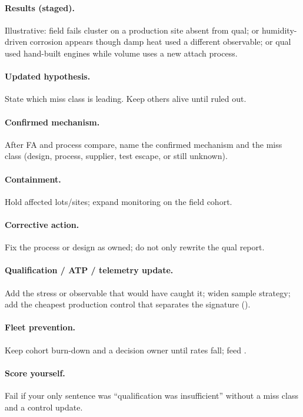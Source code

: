 \paragraph{Results (staged).}
Illustrative: field fails cluster on a production site absent from qual; or
humidity-driven corrosion appears though damp heat used a different observable;
or qual used hand-built engines while volume uses a new attach process.

\paragraph{Updated hypothesis.}
State which miss class is leading. Keep others alive until ruled out.

\paragraph{Confirmed mechanism.}
After FA and process compare, name the confirmed mechanism and the miss class
(design, process, supplier, test escape, or still unknown).

\paragraph{Containment.}
Hold affected lots/sites; expand monitoring on the field cohort.

\paragraph{Corrective action.}
Fix the process or design as owned; do not only rewrite the qual report.

\paragraph{Qualification / ATP / telemetry update.}
Add the stress or observable that would have caught it; widen sample strategy;
add the cheapest production control that separates the signature
().

\paragraph{Fleet prevention.}
Keep cohort burn-down and a decision owner until rates fall; feed
.

\paragraph{Score yourself.}
Fail if your only sentence was ``qualification was insufficient'' without a
miss class and a control update.

